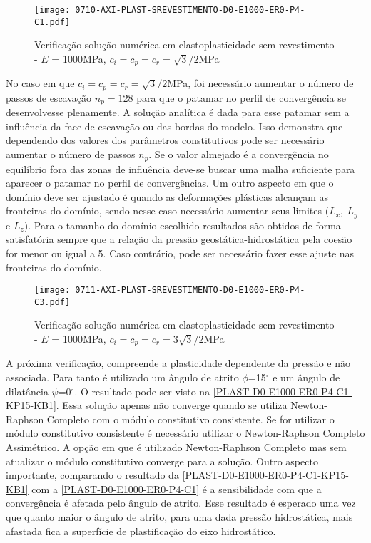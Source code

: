 \begin{figure}[H]
	\begin{center}
		\texttt{[image: 0710-AXI-PLAST-SREVESTIMENTO-D0-E1000-ER0-P4-C1.pdf]}
	\end{center}
	\caption{\label{PLAST-D0-E1000-ER0-P4-C1}Verificação solução numérica em elastoplasticidade sem revestimento - $E$ = 1000MPa,  $c_i=c_p=c_r = \sqrt{3}/2$MPa}
\end{figure}
No caso em que $c_i=c_p=c_r = \sqrt{3}/2$MPa, foi necessário aumentar o número de passos de escavação $n_p = 128$ para que o patamar no perfil de convergência se desenvolvesse plenamente. A solução analítica é dada para esse patamar sem a influência da face de escavação ou das bordas do modelo. Isso demonstra que dependendo dos valores dos parâmetros constitutivos pode ser necessário aumentar o número de passos $n_p$. Se o valor almejado é a convergência no equilíbrio fora das zonas de influência deve-se buscar uma malha suficiente para aparecer o patamar no perfil de convergências. Um outro aspecto em que o domínio deve ser ajustado é quando as deformações plásticas alcançam as fronteiras do domínio, sendo nesse caso necessário aumentar seus limites ($L_x,~L_y$ e $L_z$). Para o tamanho do domínio escolhido resultados são obtidos de forma satisfatória sempre que a relação da pressão geostática-hidrostática pela coesão for menor ou igual a 5. Caso contrário, pode ser necessário fazer esse ajuste nas fronteiras do domínio.
\begin{figure}[H]
	\begin{center}
		\texttt{[image: 0711-AXI-PLAST-SREVESTIMENTO-D0-E1000-ER0-P4-C3.pdf]}
	\end{center}
	\caption{\label{PLAST-D0-E1000-ER0-P4-C3}Verificação solução numérica em elastoplasticidade sem revestimento - $E$ = 1000MPa, $c_i=c_p=c_r = 3\sqrt{3}/2$MPa}
\end{figure}
 A próxima verificação, compreende a plasticidade dependente da pressão e não associada. Para tanto é utilizado um ângulo de atrito $\phi$=15$^\circ$ e um ângulo de dilatância $\psi$=0$^\circ$. O resultado pode ser visto na \autoref{PLAST-D0-E1000-ER0-P4-C1-KP15-KB1}. Essa solução apenas não converge quando se utiliza Newton-Raphson Completo com o módulo constitutivo consistente. Se for utilizar o módulo constitutivo consistente é necessário utilizar o Newton-Raphson Completo Assimétrico. A opção em que é utilizado Newton-Raphson Completo mas sem atualizar o módulo constitutivo converge para a solução. Outro aspecto importante, comparando o resultado da \autoref{PLAST-D0-E1000-ER0-P4-C1-KP15-KB1} com a \autoref{PLAST-D0-E1000-ER0-P4-C1} é a sensibilidade com que a convergência é afetada pelo ângulo de atrito. Esse resultado é esperado uma vez que quanto maior o ângulo de atrito, para uma dada pressão hidrostática, mais afastada fica a superfície de plastificação do eixo hidrostático.
